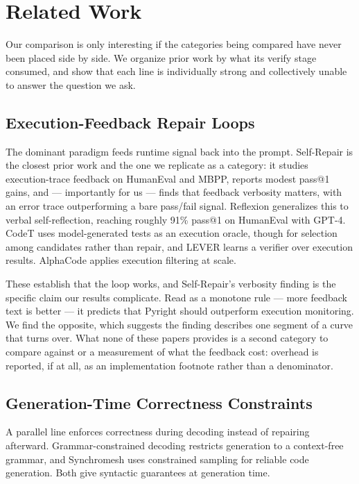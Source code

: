 \section{Related Work}

Our comparison is only interesting if the categories being compared have never been placed side by side. We organize prior work by what its verify stage consumed, and show that each line is individually strong and collectively unable to answer the question we ask.

\subsection{Execution-Feedback Repair Loops}

The dominant paradigm feeds runtime signal back into the prompt. Self-Repair \cite{Olausson2023SelfRepair} is the closest prior work and the one we replicate as a category: it studies execution-trace feedback on HumanEval and MBPP, reports modest pass@1 gains, and --- importantly for us --- finds that feedback verbosity matters, with an error trace outperforming a bare pass/fail signal. Reflexion \cite{Shinn2023Reflexion} generalizes this to verbal self-reflection, reaching roughly 91\% pass@1 on HumanEval with GPT-4. CodeT \cite{Chen2022CodeT} uses model-generated tests as an execution oracle, though for selection among candidates rather than repair, and LEVER \cite{Ni2023LEVER} learns a verifier over execution results. AlphaCode \cite{Li2022AlphaCode} applies execution filtering at scale.

These establish that the loop works, and Self-Repair's verbosity finding is the specific claim our results complicate. Read as a monotone rule --- more feedback text is better --- it predicts that Pyright should outperform execution monitoring. We find the opposite, which suggests the finding describes one segment of a curve that turns over. What none of these papers provides is a second category to compare against or a measurement of what the feedback cost: overhead is reported, if at all, as an implementation footnote rather than a denominator.

\subsection{Generation-Time Correctness Constraints}

A parallel line enforces correctness during decoding instead of repairing afterward. Grammar-constrained decoding \cite{Geng2023Grammar} restricts generation to a context-free grammar, and Synchromesh \cite{Poesia2021Synchromesh} uses constrained sampling for reliable code generation. Both give syntactic guarantees at generation time.


